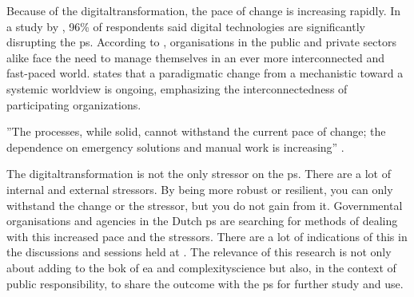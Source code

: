 Because of the \gls{digitaltransformation}, the pace of change is increasing rapidly. In a study by \textcite{Eggers2015}, 96\% of respondents said digital technologies are significantly disrupting the \gls{ps}. According to \textcite{Nurmi2021}, organisations in the public and private sectors alike face the need to manage themselves in an ever more interconnected and fast-paced world. \textcite{Guggenberger2020} states that a paradigmatic change from a mechanistic toward a systemic worldview is ongoing, emphasizing the interconnectedness of participating organizations. 

\begin{remark}
	''The processes, while solid, cannot withstand the current pace of change; the dependence on emergency solutions and manual work is increasing'' \parencite[p.~2]{Wiebes2014}.
\end{remark}

The \gls{digitaltransformation} is not the only \gls{stressor} on the \gls{ps}. There are a lot of internal and external \glspl{stressor}. By being more \gls{robust} or \gls{resilient}, you can only withstand the change or the \gls{stressor}, but you do not gain from it. Governmental organisations and agencies in the Dutch \gls{ps} are searching for methods of dealing with this increased pace and the stressors. There are a lot of indications of this in the discussions and sessions held at \textcite{iBestuurterugblik2021}. The relevance of this research is not only about adding to the \acrshort{bok} of \acrshort{ea} and \gls{complexityscience} but also, in the context of public responsibility, to share the outcome with the \gls{ps} for further study and use.

